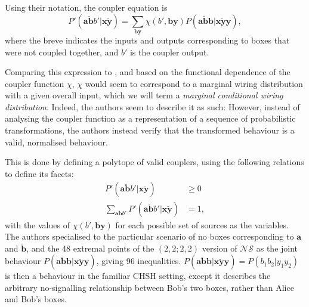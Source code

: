 \documentclass[10pt, a4paper]{article}
\numberwithin{equation}{section} %
\theoremstyle{definition}
\theoremstyle{plain}
\newcommand{\?}{\mathrel{?}} %
\newcommand{\cvec}[1]{\boldsymbol{\mathbf{#1}}}    %
\newcommand{\NSs}{\mathcal{NS}}
\begin{document}
                  Using their notation, the coupler equation is~\cite[Eq. 29]{ShortEntangleSwap}
                  \begin{equation}
                    P'(\cvec{a\breve{b}}b'|\cvec{x\breve{y}}) = \sum_{\cvec{by}} \chi(b',\cvec{by})P(\cvec{a\breve{b}b}|\cvec{x\breve{y}y}),
                  \end{equation}
                  where the breve indicates the inputs and outputs corresponding to boxes that were not coupled together, and \(b'\) is the coupler output.

                  Comparing this expression to , and based on the functional dependence of the coupler function \(\chi\), \(\chi\) would seem to correspond to a marginal wiring distribution with a given overall input, which we will term a \emph{marginal conditional wiring distribution}. Indeed, the authors seem to describe it as such:
                  However, instead of analysing the coupler function as a representation of a sequence of probabilistic transformations, the authors instead verify that the transformed behaviour is a valid, normalised behaviour.

                  This is done by defining a polytope of valid couplers, using the following relations to define its facets:
                  \begin{align}
                    P'(\cvec{a\breve{b}}b'|\cvec{x\breve{y}}) &\geq 0 \\
                    \sum_{\cvec{a\breve{b}}b'} P'(\cvec{a\breve{b}}b'|\cvec{x\breve{y}}) &= 1,
                  \end{align}
                  with the values of \(\chi(b',\cvec{by})\) for each possible set of sources as the variables. The authors specialised to the particular scenario of no boxes corresponding to \(\cvec{a}\) and \(\cvec{\breve{b}}\), and the 48 extremal points of the \((2,2;2,2)\) version of \(\NSs\) as the joint behaviour \(P(\cvec{a\breve{b}b}|\cvec{x\breve{y}y})\), giving 96 inequalities. \(P(\cvec{a\breve{b}b}|\cvec{x\breve{y}y}) = P(b_1b_2|y_1y_2)\) is then a behaviour in the familiar CHSH setting, except it describes the arbitrary no-signalling relationship between Bob's two boxes, rather than Alice and Bob's boxes.
\end{document}
